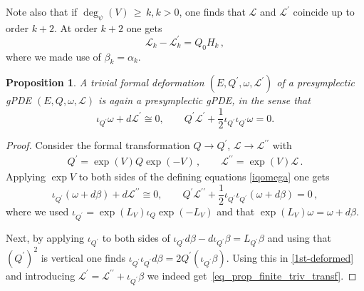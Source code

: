 \documentclass[a4paper,12pt]{article}
\numberwithin{equation}{section} %
\renewcommand{\simeq}{\cong}
\renewcommand{\geq}{\,{\geqslant}\,}
\def\cL{\mathcal{L}}
\newcommand{\h}{\cL}
\newtheorem{proposition}[thm]{Proposition}
\begin{document}
Note also that if $\deg_\psi(V)\geq k, k>0$, one finds that  $\cL$ and $\cL^\prime$ coincide up to order $k+2$. At order $k+2$ one gets
\begin{equation}
\cL_k-\cL^\prime_k=Q_0 H_k\,,
\end{equation}
where we made use of $\beta_k=\alpha_k$.
\begin{proposition}
	\label{prop_finite_triv_transf}
	A trivial formal deformation $(E,Q^\prime,\omega,\cL^\prime)$ of a presymplectic gPDE $(E,Q,\omega,\h)$ is again a presymplectic gPDE, in the sense that
	\begin{equation}
		\iota_{Q^\prime}\omega + d\cL^\prime \simeq 0, \qquad Q^\prime \cL^\prime + \frac{1}{2}\iota_{Q^\prime}\iota_{Q^\prime}\omega = 0. \label{eq_prop_finite_triv_transf}
	\end{equation}
    \end{proposition}
	\begin{proof}


Consider the formal transformation $Q \to Q^\prime$, $\cL\to \cL^{\prime\prime}$ with
    \begin{gather}
    Q^\prime=\exp(V) Q \exp(-V)\,, \qquad
    \cL^{\prime\prime}=\exp(V)\cL\,.
    \end{gather}
    Applying $\exp{V}$ to both sides of the defining equations \eqref{iqomega} one gets
    \begin{equation}
    \label{1st-deformed}
       \iota_{Q^\prime}(\omega+d\beta) + d\cL^{\prime\prime} \simeq 0, \qquad Q^\prime \cL^{\prime\prime}+ \frac{1}{2}\iota_{Q^\prime}\iota_{Q^\prime}(\omega+d\beta) = 0\,,
    \end{equation}
where we used  $\iota_{Q^\prime}=\exp({L_V})\iota_Q \exp(-L_V)$ and that $\exp({L_V})\omega=\omega+d\beta$.

Next, by applying $\iota_{Q^\prime}$ to both sides of $\iota_{Q^\prime}d\beta-d \iota_{Q^\prime}\beta=L_{Q^\prime}\beta$
and using that $(Q^\prime)^2$ is vertical one finds $\iota_{Q^\prime}\iota_{Q^\prime}d\beta=2{Q^\prime}(\iota_{Q^\prime}\beta)$. Using this in \eqref{1st-deformed} and introducing $\cL^\prime=\cL^{\prime\prime}+\iota_{Q^\prime}\beta$ we indeed get~\eqref{eq_prop_finite_triv_transf}.
\end{proof}
\end{document}
